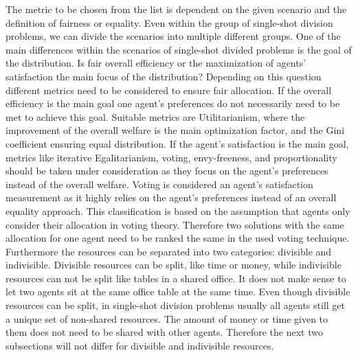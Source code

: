 \documentclass[german, a4paper, 11pt, oneside]{scrbook}
\begin{document}
The metric to be chosen from the list is dependent on the given scenario and the definition of fairness or equality. Even within the group of single-shot division problems, we can divide the scenarios into multiple different groups. One of the main differences within the scenarios of single-shot divided problems is the goal of the distribution. Is fair overall efficiency or the maximization of agents' satisfaction the main focus of the distribution? Depending on this question different metrics need to be considered to ensure fair allocation. If the overall efficiency is the main goal one agent's preferences do not necessarily need to be met to achieve this goal. Suitable metrics are Utilitarianism, where the improvement of the overall welfare is the main optimization factor, and the Gini coefficient ensuring equal distribution. If the agent's satisfaction is the main goal, metrics like iterative Egalitarianism, voting, envy-freeness, and proportionality should be taken under consideration as they focus on the agent's preferences instead of the overall welfare. Voting is considered an agent's satisfaction measurement as it highly relies on the agent's preferences instead of an overall equality approach. This classification is based on the assumption that agents only consider their allocation in voting theory. Therefore two solutions with the same allocation for one agent need to be ranked the same in the used voting technique.\\ Furthermore the resources can be separated into two categories: divisible and indivisible. Divisible resources can be split, like time or money, while indivisible resources can not be split like tables in a shared office. It does not make sense to let two agents sit at the same office table at the same time. Even though divisible resources can be split, in single-shot division problems usually all agents still get a unique set of non-shared resources. The amount of money or time given to them does not need to be shared with other agents. Therefore the next two subsections will not differ for divisible and indivisible resources.
\end{document}
